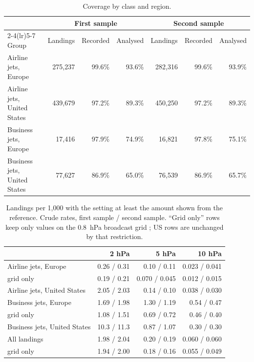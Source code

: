 \documentclass[11pt]{article}
\begin{document}
\begin{table}[ht]
\centering
\caption{Coverage by class and region.}\label{tab:b-coverage}
\small\setlength{\tabcolsep}{4pt}
\begin{tabular}{lrrrrrr}
\toprule
 & \multicolumn{3}{c}{First sample} & \multicolumn{3}{c}{Second sample} \\
\cmidrule(lr){2-4}\cmidrule(lr){5-7}
Group & Landings & Recorded & Analysed & Landings & Recorded & Analysed \\
\midrule
Airline jets, Europe & 275{,}237 & 99.6\% & 93.6\% & 282{,}316 & 99.6\% & 93.9\% \\
Airline jets, United States & 439{,}679 & 97.2\% & 89.3\% & 450{,}250 & 97.2\% & 89.3\% \\
Business jets, Europe & 17{,}416 & 97.9\% & 74.9\% & 16{,}821 & 97.8\% & 75.1\% \\
Business jets, United States & 77{,}627 & 86.9\% & 65.0\% & 76{,}539 & 86.9\% & 65.7\% \\
\bottomrule
\end{tabular}
\end{table}

\begin{table}[ht]
\centering
\caption{Landings per 1{,}000 with the setting at least the amount shown from the reference. Crude rates, first sample / second sample. ``Grid only'' rows keep only values on the 0.8~hPa broadcast grid ; US rows are unchanged by that restriction.}\label{tab:b-rates}
\begin{tabular}{lrrr}
\toprule
 & 2 hPa & 5 hPa & 10 hPa \\
\midrule
Airline jets, Europe & 0.26 / 0.31 & 0.10 / 0.11 & 0.023 / 0.041 \\
\quad grid only & 0.19 / 0.21 & 0.070 / 0.045 & 0.012 / 0.015 \\
Airline jets, United States & 2.05 / 2.03 & 0.14 / 0.10 & 0.038 / 0.030 \\
Business jets, Europe & 1.69 / 1.98 & 1.30 / 1.19 & 0.54 / 0.47 \\
\quad grid only & 1.08 / 1.51 & 0.69 / 0.72 & 0.46 / 0.40 \\
Business jets, United States & 10.3 / 11.3 & 0.87 / 1.07 & 0.30 / 0.30 \\
\midrule
All landings & 1.98 / 2.04 & 0.20 / 0.19 & 0.060 / 0.060 \\
\quad grid only & 1.94 / 2.00 & 0.18 / 0.16 & 0.055 / 0.049 \\
\bottomrule
\end{tabular}
\end{table}
\end{document}
